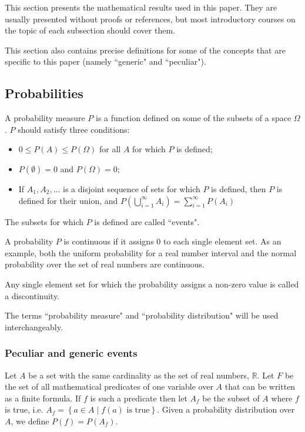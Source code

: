 \documentclass[a4paper
,draft
]{article}
\def\reale{\mathbb{R}}
\newcommand{\multime}[1]{\left\{ #1 \right\}}
\newcommand{\ghilimele}[1]{``#1"}
\begin{document}
This section presents the mathematical results used in this paper. They are
usually presented without proofs or references, but most introductory courses
on the topic of each subsection should cover them.

This section also contains precise definitions for some of the concepts that
are specific to this paper
(namely \ghilimele{generic} and \ghilimele{peculiar}).

\subsection{Probabilities}
\label{sec:probabilities}

A probability measure $P$ is a function defined on some of the subsets of a
space $\Omega$. $P$ should satisfy three conditions:
\begin{itemize}
  \item $0 \le P(A) \le P(\Omega)$ for all $A$ for which $P$ is defined;
  \item $P(\emptyset) = 0$ and $P(\Omega) = 0$;
  \item If $A_1, A_2, \dots$ is a disjoint sequence of sets for which $P$ is
        defined, then $P$ is defined for their union, and
        $P(\bigcup\limits_{i=1}^{\infty} A_i)=\sum_{i=1}^{\infty}P(A_i)$
\end{itemize}

The subsets for which $P$ is defined are called \ghilimele{events}.

A probability $P$ is continuous if it assigns $0$ to each single element set.
As an example, both the uniform probability for a real number interval and the
normal probability over the set of real numbers are continuous.

Any single element set for which the probability assigns a non-zero value is
called a discontinuity.

The terms \ghilimele{probability measure} and
\ghilimele{probability distribution} will be used interchangeably.

\subsubsection{Peculiar and generic events}

Let $A$ be a set with the same cardinality as the set of real numbers, $\reale$.
Let $F$ be the set of
all mathematical predicates of one variable over $A$ that can be written as a
finite formula.
If $f$ is such a predicate then let $A_f$ be the subset of
$A$ where $f$ is true, i.e. $A_f=\multime{a\in A\mid f(a) \mbox{ is true}}$.
Given a probability distribution over $A$, we define $P(f)=P(A_f)$.
\end{document}
